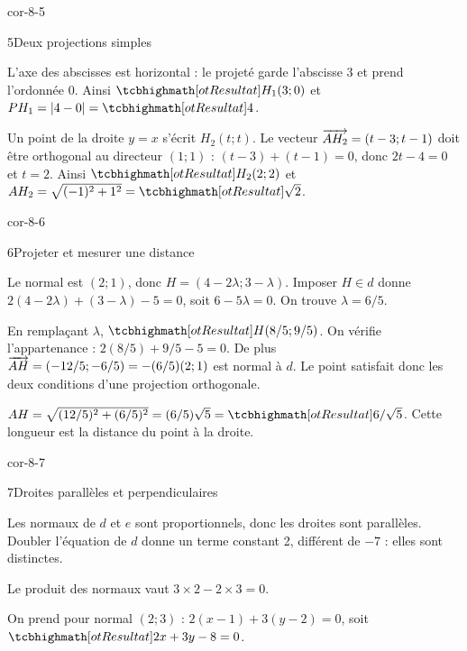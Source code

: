 \begin{blocLivre}{cor-8-5}
\begin{corrige}{5}{Deux projections simples}
\begin{questions}
\item L’axe des abscisses est horizontal : le projeté garde l’abscisse 3 et prend l’ordonnée 0.
Ainsi $\res{H_1(3;0)}$ et $PH_1=|4-0|=\res{4}$.
\item Un point de la droite $y=x$ s’écrit $H_2(t;t)$.
Le vecteur $\overrightarrow{AH_2}=(t-3;t-1)$ doit être orthogonal au directeur $(1;1)$ :
$(t-3)+(t-1)=0$, donc $2t-4=0$ et $t=2$.
Ainsi $\res{H_2(2;2)}$ et $AH_2=\sqrt{(-1)^2+1^2}=\res{\sqrt2}$.
\end{questions}
\label{figgeo-08-05-cor}
\end{corrige}
\end{blocLivre}
\begin{blocLivre}{cor-8-6}
\begin{corrige}{6}{Projeter et mesurer une distance}
\begin{questions}
\item Le normal est $(2;1)$, donc $H=(4-2\lambda;3-\lambda)$.
Imposer $H\in d$ donne
$2(4-2\lambda)+(3-\lambda)-5=0$, soit $6-5\lambda=0$.
On trouve $\lambda=6/5$.
\item En remplaçant $\lambda$, $\res{H(8/5;9/5)}$.
On vérifie l’appartenance : $2(8/5)+9/5-5=0$.
De plus $\overrightarrow{AH}=(-12/5;-6/5)=-(6/5)(2;1)$ est normal à $d$.
Le point satisfait donc les deux conditions d’une projection orthogonale.
\item $AH=\sqrt{(12/5)^2+(6/5)^2}=(6/5)\sqrt5=\res{6/\sqrt5}$.
Cette longueur est la distance du point à la droite.
\end{questions}
\label{figgeo-08-06-cor}
\end{corrige}
\end{blocLivre}
\begin{blocLivre}{cor-8-7}
\begin{corrige}{7}{Droites parallèles et perpendiculaires}
\begin{questions}
\item Les normaux de $d$ et $e$ sont proportionnels, donc les droites sont parallèles. Doubler l’équation de $d$ donne un terme constant 2, différent de $-7$ : elles sont distinctes.
\item Le produit des normaux vaut $3\times2-2\times3=0$.
\item On prend pour normal $(2;3)$ : $2(x-1)+3(y-2)=0$, soit $\res{2x+3y-8=0}$.
\end{questions}

\label{figgeo-08-07-cor}
\end{corrige}
\end{blocLivre}
